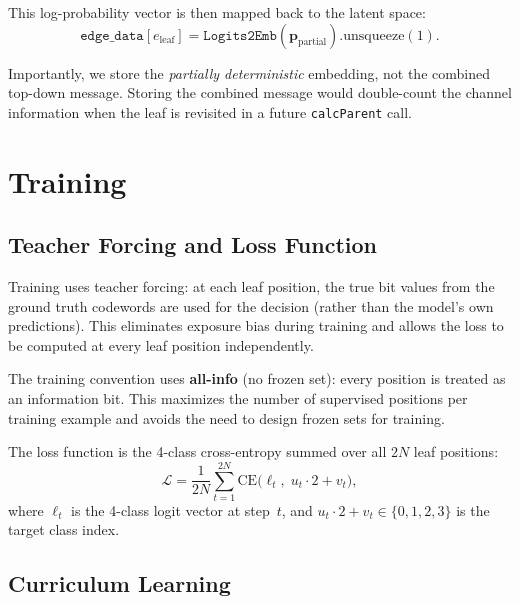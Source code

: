 \documentclass[11pt,a4paper]{article}
\begin{document}
This log-probability vector is then mapped back to the latent space:
\begin{equation}
    \texttt{edge\_data}[e_{\text{leaf}}] = \texttt{Logits2Emb}(\bm{p}_{\text{partial}}).\text{unsqueeze}(1).
\end{equation}

Importantly, we store the \emph{partially deterministic} embedding, not the combined top-down message. Storing the combined message would double-count the channel information when the leaf is revisited in a future \texttt{calcParent} call.

\section{Training}
\label{sec:training}

\subsection{Teacher Forcing and Loss Function}

Training uses teacher forcing: at each leaf position, the true bit values from the ground truth codewords are used for the decision (rather than the model's own predictions). This eliminates exposure bias during training and allows the loss to be computed at every leaf position independently.

The training convention uses \textbf{all-info} (no frozen set): every position is treated as an information bit. This maximizes the number of supervised positions per training example and avoids the need to design frozen sets for training.

The loss function is the 4-class cross-entropy summed over all $2N$ leaf positions:
\begin{equation}
    \mathcal{L} = \frac{1}{2N} \sum_{t=1}^{2N} \text{CE}\bigl(\bm{\ell}_t,\; u_t \cdot 2 + v_t\bigr),
    \label{eq:loss}
\end{equation}
where $\bm{\ell}_t$ is the 4-class logit vector at step~$t$, and $u_t \cdot 2 + v_t \in \{0, 1, 2, 3\}$ is the target class index.

\subsection{Curriculum Learning}
\label{sec:curriculum}
\end{document}
